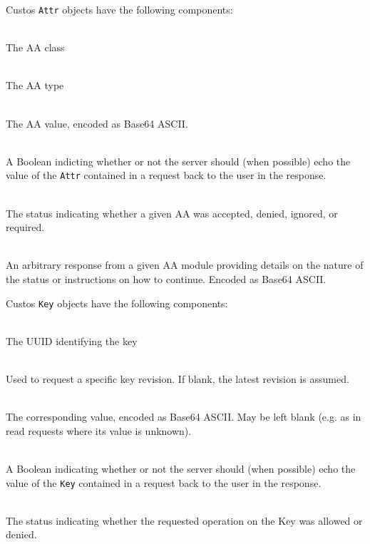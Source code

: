 \noindent
Custos \texttt{Attr} objects have the following components:

\begin{packed_desc}
\item[\texttt{Class}] \hfill \\ The AA class
\item[\texttt{Type}] \hfill \\ The AA type
\item[\texttt{Value}] \hfill \\ The AA value, encoded as Base64 ASCII.
\item[\texttt{Echo}] \hfill \\ A Boolean indicting whether or not the
  server should (when possible) echo the value of the \texttt{Attr}
  contained in a request back to the user in the response.
\item[\texttt{Status} (Response Only)] \hfill \\ The status indicating
  whether a given AA was accepted, denied, ignored, or required.
\item[\texttt{ResValue} (Response Only)] \hfill \\ An arbitrary
  response from a given AA module providing details on the nature of
  the status or instructions on how to continue. Encoded as Base64
  ASCII.
\end{packed_desc}

\noindent
Custos \texttt{Key} objects have the following components:

\begin{packed_desc}
\item[\texttt{UUID}] \hfill \\ The UUID identifying the key
\item[\texttt{Revision}] \hfill \\ Used to request a specific key
  revision. If blank, the latest revision is assumed.
\item[\texttt{Value}] \hfill \\ The corresponding value, encoded as
  Base64 ASCII. May be left blank (e.g. as in read requests where its
  value is unknown).
\item[\texttt{Echo}] \hfill \\ A Boolean indicating whether or not the
  server should (when possible) echo the value of the \texttt{Key}
  contained in a request back to the user in the response.
\item[\texttt{Status} (Response Only)] \hfill \\ The status indicating
  whether the requested operation on the Key was allowed or denied.
\end{packed_desc}

